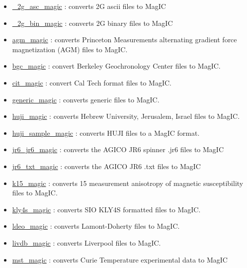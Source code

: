 \documentclass[11pt]{book}
\begin{document}
{{\begin{itemize}
\begin{itemize}
\item \href{https://pmagpy.github.io/PmagPy_MagIC.html#_2g_asc_magic}{\_2g\_asc\_magic} : converts 2G ascii files to MagIC
\item \href{https://pmagpy.github.io/PmagPy_MagIC.html#_2g_bin_magic}{\_2g\_bin\_magic} : converts 2G binary files to MagIC
\item \href{https://pmagpy.github.io/PmagPy_MagIC.html#agm_magic}{agm\_magic} : converts Princeton Measurements alternating gradient force magnetization (AGM) files to MagIC.
\item \href{https://pmagpy.github.io/PmagPy_MagIC.html#bgc_magic}{bgc\_magic} : convert Berkeley Geochronology Center files to MagIC.
\item \href{https://pmagpy.github.io/PmagPy_MagIC.html#cit_magic}{cit\_magic} : convert Cal Tech format files to MagIC.
\item \href{https://pmagpy.github.io/PmagPy_MagIC.html#generic_magic}{generic\_magic} : converts generic files to MagIC.
\item \href{https://pmagpy.github.io/PmagPy_MagIC.html#huji_magic}{huji\_magic} : converts Hebrew University, Jerusalem, Israel files to MagIC.
\item \href{https://pmagpy.github.io/PmagPy_MagIC.html#huji_sample_magic}{huji\_sample\_magic} : converts HUJI files to a MagIC format.
\item \href{https://pmagpy.github.io/PmagPy_MagIC.html#jr6_jr6_magic}{jr6\_jr6\_magic} : converts the AGICO JR6 spinner .jr6 files to MagIC
\item \href{https://pmagpy.github.io/PmagPy_MagIC.html#jr6_txt_magic}{jr6\_txt\_magic} : converts the AGICO JR6 .txt files to MagIC
\item \href{https://pmagpy.github.io/PmagPy_MagIC.html#k15_magic}{k15\_magic} : converts 15 measurement anisotropy of magnetic susceptibility files to MagIC.
\item \href{https://pmagpy.github.io/PmagPy_MagIC.html#kly4s_magic}{kly4s\_magic} : converts SIO KLY4S formatted files to MagIC.
\item \href{https://pmagpy.github.io/PmagPy_MagIC.html#ldeo_magic}{ldeo\_magic} : converts Lamont-Doherty files to MagIC.
\item \href{https://pmagpy.github.io/PmagPy_MagIC.html#livdb_magic}{livdb\_magic} : converts Liverpool files to MagIC.
\item \href{https://pmagpy.github.io/PmagPy_MagIC.html#mst_magic}{mst\_magic} : converts Curie Temperature experimental data to MagIC

\end{itemize}
\end{itemize}}}
\end{document}
